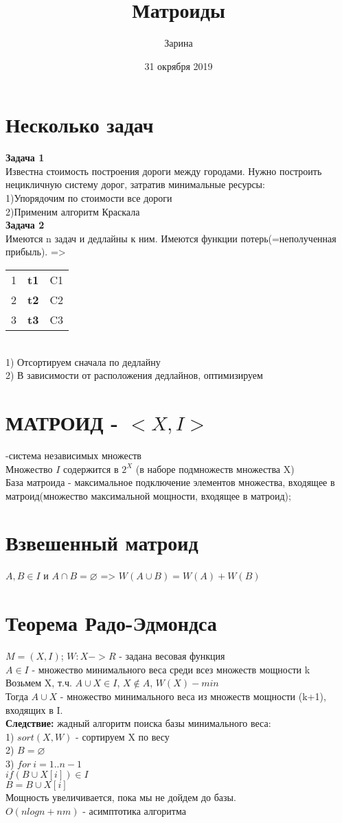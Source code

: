 \documentclass[a4paper,12pt]{article}
\author{Зарина}
\title{Матроиды}
\date{31 окрября 2019}
\begin{document}
\section {Несколько задач}
\textbf{Задача 1}\\
Известна стоимость построения дороги между городами. Нужно построить нецикличную систему дорог, затратив минимальные ресурсы:\\
1)Упорядочим по стоимости все дороги\\
2)Применим алгоритм Краскала\\
\textbf{Задача 2}\\
Имеются n задач и дедлайны к ним. Имеются функции потерь(=неполученная прибыль). =>
\begin{tabular}{ccc}
1 & \textbf{t1} & C1 \\
2 & \textbf{t2} & C2 \\
3 & \textbf{t3}& C3 \\
\end{tabular}\\
1) Отсортируем сначала по дедлайну\\
2) В зависимости от расположения дедлайнов, оптимизируем\\
\section{МАТРОИД - $<X,I>$}
-система независимых множеств\\
Множество $I$ содержится в $2^X$ (в наборе подмножеств множества X)\\ 
База матроида - максимальное подключение элементов множества, входящее в матроид(множество максимальной мощности, входящее в матроид);
\section {Взвешенный матроид}
$A,B \in I$ и $A\cap B= \varnothing $ => $W(A\cup B)=W(A)+W(B)$
\section{Теорема Радо-Эдмондса}
$M=(X,I)$; $W:X->R$ - задана весовая функция\\
$A\in I$ - множество минимального веса среди всез множеств мощности k\\
Возьмем X, т.ч.  $A\cup X \in I$, $X \notin A$, $W(X)-min$\\
Тогда  $A\cup X$ - множество минимального веса из множеств мощности (k+1), входящих в I.\\
 \textbf{Следствие:} жадный алгоритм поиска базы минимального веса:\\
 1) $sort (X,W)$ - сортируем X по весу\\
 2) $B= \varnothing $\\
 3) $for \: i=1..n-1$\\
 $if (B\cup X[i]) \in I$\\
 $B=B\cup {X[i]}$\\
 Мощность увеличивается, пока мы не дойдем до базы.\\
 $O(nlogn+nm)$ - асимптотика алгоритма
\end{document}
